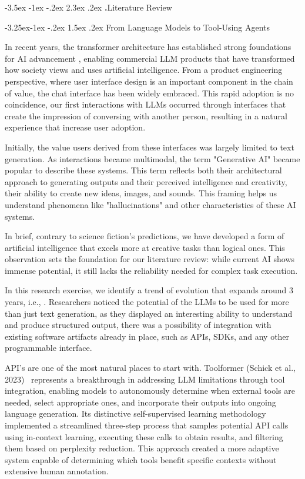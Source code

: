 \documentclass[journal,twoside,10pt]{IEEEtran}
\makeatletter
\renewcommand\section{\@startsection{section}{1}{\z@}%
                       {-3.5ex \@plus -1ex \@minus -.2ex}%
                       {2.3ex \@plus.2ex}%
                       {\normalfont\Large\bfseries\Roman{section}.\quad}}
\renewcommand\subsection{\@startsection{subsection}{2}{\z@}%
                       {-3.25ex\@plus -1ex \@minus -.2ex}%
                       {1.5ex \@plus .2ex}%
                       {\normalfont\large\bfseries}}
\makeatother
\begin{document}
\section{Literature Review}

\subsection{From Language Models to Tool-Using Agents}

In recent years, the transformer architecture has established strong foundations for AI advancement , enabling commercial LLM products that have transformed how society views and uses artificial intelligence. From a product engineering perspective, where user interface design is an important component in the chain of value, the chat interface has been widely embraced. This rapid adoption is no coincidence, our first interactions with LLMs occurred through interfaces that create the impression of conversing with another person, resulting in a natural experience that increase user adoption.

Initially, the value users derived from these interfaces was largely limited to text generation. As interactions became multimodal, the term "Generative AI" became popular to describe these systems. This term reflects both their architectural approach to generating outputs and their perceived intelligence and creativity, their ability to create new ideas, images, and sounds. This framing helps us understand phenomena like "hallucinations" and other characteristics of these AI systems.

In brief, contrary to science fiction's predictions, we have developed a form of artificial intelligence that excels more at creative tasks than logical ones. This observation sets the foundation for our literature review: while current AI shows immense potential, it still lacks the reliability needed for complex task execution.

In this research exercise, we identify a trend of evolution that expands around 3 years, i.e., \cite{schick2023toolformer, qin2023toolllm}. Researchers noticed the potential of the LLMs to be used for more than just text generation, as they displayed an interesting ability to understand and produce structured output, there was a possibility of integration with existing software artifacts already in place, such as APIs, SDKs, and any other programmable interface.

API's are one of the most natural places to start with.  Toolformer (Schick et al., 2023)~\cite{schick2023toolformer} represents a breakthrough in addressing LLM limitations through tool integration, enabling models to autonomously determine when external tools are needed, select appropriate ones, and incorporate their outputs into ongoing language generation. Its distinctive self-supervised learning methodology implemented a streamlined three-step process that samples potential API calls using in-context learning, executing these calls to obtain results, and filtering them based on perplexity reduction. This approach created a more adaptive system capable of determining which tools benefit specific contexts without extensive human annotation.
\end{document}
